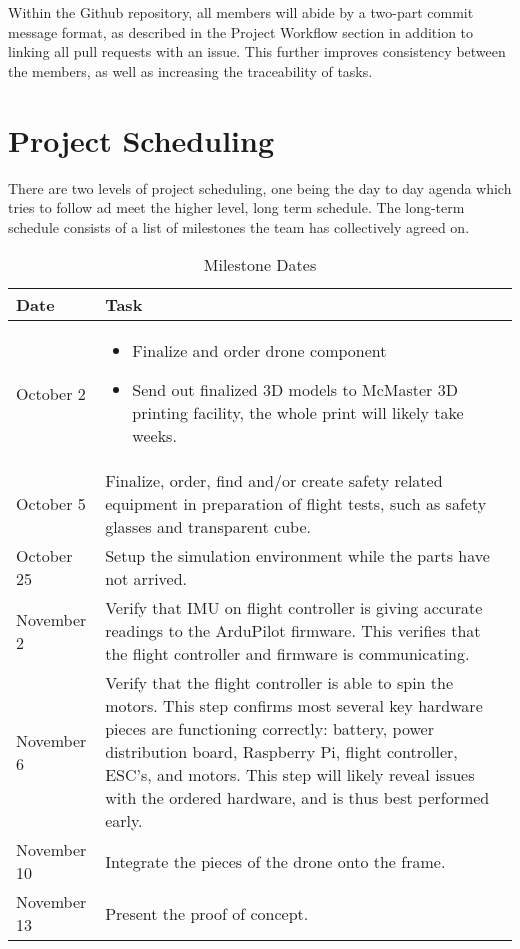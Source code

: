 \documentclass{article}
\begin{document}
Within the Github repository, all members will abide by a two-part commit message format, as described in the Project Workflow section in addition to linking all pull requests with an issue. This further improves consistency between the members, as well as increasing the traceability of tasks.


\section{Project Scheduling}
There are two levels of project scheduling, one being the day to day agenda which tries to follow ad meet the higher level, long term schedule. The long-term schedule consists of a list of milestones the team has collectively agreed on. 


\begin{table}[h]
\begin{center}
\caption {Milestone Dates} \label{tab:title}
\begin{tabular}{ | m{2cm} | m{11cm} | } 
\hline
Date & Task\\
\hline
October 2 &
\begin{itemize}
    \item Finalize and order drone component
    \item Send out finalized 3D models to McMaster 3D printing facility, the whole print will likely take weeks.
\end{itemize}   \\
\hline
October 5 & Finalize, order, find and/or create safety related equipment in preparation of flight tests, such as safety glasses and transparent cube.\\
\hline
October 25 & Setup the simulation environment while the parts have not arrived.\\
\hline
November 2 & Verify that IMU on flight controller is giving accurate readings to the ArduPilot firmware. This verifies that the flight controller and firmware is communicating.\\
\hline
November 6 & Verify that the flight controller is able to spin the motors. This step confirms most several key hardware pieces are functioning correctly: battery, power distribution board, Raspberry Pi, flight controller, ESC's, and motors. This step will likely reveal issues with the ordered hardware, and is thus best performed early. \\
\hline
November 10 & Integrate the pieces of the drone onto the frame. \\
\hline
November 13 & Present the proof of concept.\\

\end{tabular}
\end{center}
\end{table}
\end{document}
